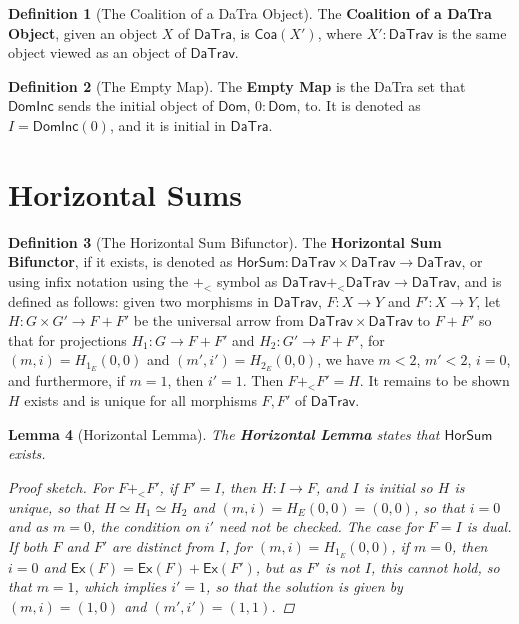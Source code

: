 \documentclass[11pt]{article}
\theoremstyle{definition}
\newtheorem{definition}{Definition}[section]
\theoremstyle{plain}
\newtheorem{lemma}[definition]{Lemma}
\begin{document}
\begin{definition}[The Coalition of a DaTra Object]
The \textbf{Coalition of a DaTra Object}, given an object $X$ of
$\mathsf{DaTra}$, is $\mathsf{Coa}(X')$, where $X' : \mathsf{DaTrav}$ is the
same object viewed as an object of $\mathsf{DaTrav}$.
\end{definition}

\begin{definition}[The Empty Map]
The \textbf{Empty Map} is the DaTra set that $\mathsf{DomInc}$ sends the
initial object of $\mathsf{Dom}$, $0 : \mathsf{Dom}$, to. It is denoted as
$I=\mathsf{DomInc}(0)$, and it is initial in $\mathsf{DaTra}$.
\end{definition}

\section{Horizontal Sums}

\begin{definition}[The Horizontal Sum Bifunctor]
The \textbf{Horizontal Sum Bifunctor}, if it exists, is denoted as
$\mathsf{HorSum} : \mathsf{DaTrav} \times \mathsf{DaTrav}
\to \mathsf{DaTrav}$, or using infix notation using the $+_{<}$ symbol as
$\mathsf{DaTrav} +_{<} \mathsf{DaTrav} \to \mathsf{DaTrav}$, and is defined
as follows: given two morphisms in $\mathsf{DaTrav}$, $F : X \to Y$ and
$F' : X \to Y$, let $H : G \times G' \to F+F'$ be the universal arrow from
$\mathsf{DaTrav} \times \mathsf{DaTrav}$ to $F+F'$ so that for projections
$H_1 : G \to F+F'$ and $H_2 : G' \to F+F'$, for
$(m,i)=H_{1_E}(0,0)$ and $(m',i')=H_{2_E}(0,0)$, we have $m<2$, $m'<2$,
$i=0$, and furthermore, if $m=1$, then $i'=1$. Then $F+_{<}F'=H$. It
remains to be shown $H$ exists and is unique for all morphisms $F,F'$ of
$\mathsf{DaTrav}$.
\end{definition}

\begin{lemma}[Horizontal Lemma]
The \textbf{Horizontal Lemma} states that $\mathsf{HorSum}$ exists.

\begin{proof}[Proof sketch]
For $F+_{<}F'$, if $F'=I$, then $H : I \to F$, and $I$ is initial so $H$
is unique, so that $H \simeq H_1 \simeq H_2$ and
$(m,i)=H_E(0,0)=(0,0)$, so that $i=0$ and as $m=0$, the condition on $i'$
need not be checked. The case for $F=I$ is dual. If both $F$ and $F'$ are
distinct from $I$, for $(m,i)=H_{1_E}(0,0)$, if $m=0$, then $i=0$ and
$\mathsf{Ex}(F)=\mathsf{Ex}(F)+\mathsf{Ex}(F')$, but as $F'$ is not $I$,
this cannot hold, so that $m=1$, which implies $i'=1$, so that the solution
is given by $(m,i)=(1,0)$ and $(m',i')=(1,1)$.
\end{proof}
\end{lemma}
\end{document}
